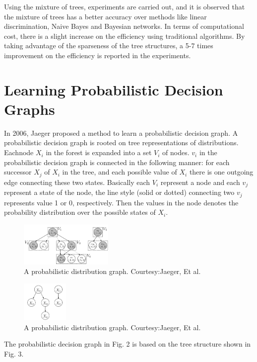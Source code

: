\documentclass[11pt]{article}
\begin{document}
\noindent Using the mixture of trees, experiments are carried out, and it is observed that the mixture of trees has a better accuracy over methods like linear discrimination, Naive Bayes and Bayesian networks. In terms of computational cost, there is a slight increase on the efficiency using traditional algorithms. By taking advantage of the sparseness of the tree structures, a 5-7 times improvement on the efficiency is reported in the experiments. 
\section{Learning Probabilistic Decision Graphs}
In 2006, Jaeger\cite{jaeger2006learning} proposed a method to learn a probabilistic decision graph. A probabilistic decision graph is rooted on tree representations of distributions. Eachnode $X_i$ in the forest is expanded into a set $V_i$ of nodes. $v_i$ in the probabilistic decision graph is connected in the following manner: for each successor $X_j$ of $X_i$ in the tree, and each possible value of $X_i$ there is one outgoing edge connecting these two states. Basically each $V_i$ represent a node and each $v_j$ represent a state of the node, the line style (solid or dotted) connecting two $v_j$ represents value 1 or 0, respectively. Then the values in the node denotes the probability distribution over the possible states of $X_i$.
\begin{figure}[h!]
	\centering
	\includegraphics[width=0.4\textwidth]{ProbabilisticDistributionGraph}
	\caption{A probabilistic distribution graph. Courtesy:Jaeger, Et al.}
\end{figure}
\begin{figure}[h!]
	\centering
	\includegraphics[width=0.2\textwidth]{Forests}
	\caption{A probabilistic distribution graph. Courtesy:Jaeger, Et al.}
\end{figure}
The probabilistic decision graph in Fig. 2 is based on the tree structure shown in Fig. 3.
\end{document}
